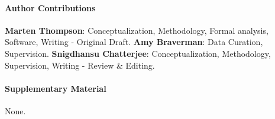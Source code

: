 \documentclass{CUP-JNL-EDS}
\begin{document}
\begin{Backmatter}
\paragraph{Author Contributions}
\textbf{Marten Thompson}: Conceptualization, Methodology, Formal analysis, Software, Writing - Original Draft. 
\textbf{Amy Braverman}: Data Curation, Supervision.
\textbf{Snigdhansu Chatterjee}: Conceptualization, Methodology, Supervision, Writing - Review \& Editing. 


\paragraph{Supplementary Material} None.

\printbibliography

\end{Backmatter}
\end{document}
